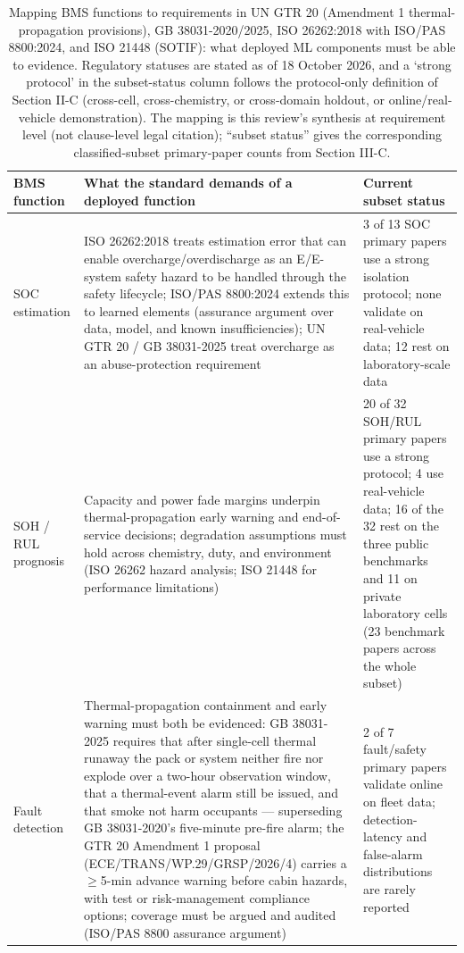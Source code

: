 \documentclass[journal]{IEEEtran}
\begin{document}
\begin{table}[!t]
\caption{Mapping BMS functions to requirements in UN GTR 20 (Amendment 1 thermal-propagation provisions), GB 38031-2020/2025, ISO 26262:2018 with ISO/PAS 8800:2024, and ISO 21448 (SOTIF): what deployed ML components must be able to evidence. Regulatory statuses are stated as of 18 October 2026, and a `strong protocol' in the subset-status column follows the protocol-only definition of Section II-C (cross-cell, cross-chemistry, or cross-domain holdout, or online/real-vehicle demonstration). The mapping is this review's synthesis at requirement level (not clause-level legal citation); ``subset status'' gives the corresponding classified-subset primary-paper counts from Section III-C.}
\label{tab:TABLE_STD}
\centering
\footnotesize
\begin{tabular}{|p{0.70in}|p{2.97in}|p{2.97in}|}
\hline
\textbf{BMS function} & \textbf{What the standard demands of a deployed function} & \textbf{Current subset status} \\
\hline
SOC estimation & ISO 26262:2018 treats estimation error that can enable overcharge/overdischarge as an E/E-system safety hazard to be handled through the safety lifecycle; ISO/PAS 8800:2024 extends this to learned elements (assurance argument over data, model, and known insufficiencies); UN GTR 20 / GB 38031-2025 treat overcharge as an abuse-protection requirement & 3 of 13 SOC primary papers use a strong isolation protocol; none validate on real-vehicle data; 12 rest on laboratory-scale data \\
SOH / RUL prognosis & Capacity and power fade margins underpin thermal-propagation early warning and end-of-service decisions; degradation assumptions must hold across chemistry, duty, and environment (ISO 26262 hazard analysis; ISO 21448 for performance limitations) & 20 of 32 SOH/RUL primary papers use a strong protocol; 4 use real-vehicle data; 16 of the 32 rest on the three public benchmarks and 11 on private laboratory cells (23 benchmark papers across the whole subset) \\
Fault detection & Thermal-propagation containment and early warning must both be evidenced: GB 38031-2025 requires that after single-cell thermal runaway the pack or system neither fire nor explode over a two-hour observation window, that a thermal-event alarm still be issued, and that smoke not harm occupants --- superseding GB 38031-2020's five-minute pre-fire alarm; the GTR 20 Amendment 1 proposal (ECE/TRANS/WP.29/GRSP/2026/4) carries a $\ge$5-min advance warning before cabin hazards, with test or risk-management compliance options; coverage must be argued and audited (ISO/PAS 8800 assurance argument) & 2 of 7 fault/safety primary papers validate online on fleet data; detection-latency and false-alarm distributions are rarely reported \\

\end{tabular}
\end{table}
\end{document}

